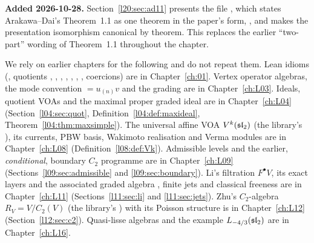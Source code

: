 \textbf{Added 2026-10-28.} Section~\ref{l20:sec:ad11} presents the file
, which states Arakawa--Dai's Theorem~1.1 as one
theorem in the paper's form, , and makes the presentation isomorphism canonical by theorem. This
replaces the earlier ``two-part'' wording of Theorem~1.1 throughout the chapter.

We rely on earlier chapters for the following and do not repeat them. Lean idioms (,
quotients , , , , , ,
, coercions) are in Chapter~\ref{ch:01}. Vertex operator algebras, the mode
convention  $=u_{(n)}v$ and the grading  are in
Chapter~\ref{ch:L03}. Ideals, quotient VOAs and the maximal proper graded ideal 
are in Chapter~\ref{ch:L04} (Section~\ref{l04:sec:quot}, Definition~\ref{l04:def:maxideal},
Theorem~\ref{l04:thm:maxsimple}). The universal affine VOA $V^k(\mathfrak{sl}_2)$ (the library's
), its currents, PBW basis, Wakimoto realisation and Verma modules are in
Chapter~\ref{ch:L08} (Definition~\ref{l08:def:Vk}). Admissible levels and the earlier, \emph{conditional},
boundary $C_2$ programme are in Chapter~\ref{ch:L09} (Sections~\ref{l09:sec:admissible} and
\ref{l09:sec:boundary}). Li's filtration $F^\bullet V$, its exact layers  and the
associated graded algebra , finite jets and classical freeness are in
Chapter~\ref{ch:L11} (Sections~\ref{l11:sec:li} and \ref{l11:sec:jets}). Zhu's $C_2$-algebra
$R_V=V/C_2(V)$ (the library's ) with its Poisson structure is in Chapter~\ref{ch:L12}
(Section~\ref{l12:sec:c2}). Quasi-lisse algebras and the example $L_{-4/3}(\mathfrak{sl}_2)$ are in
Chapter~\ref{ch:L16}.


